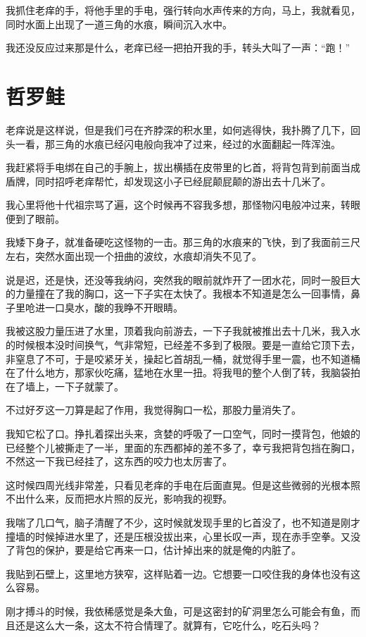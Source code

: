 我抓住老痒的手，将他手里的手电，强行转向水声传来的方向，马上，我就看见，同时水面上出现了一道三角的水痕，瞬间沉入水中。

我还没反应过来那是什么，老痒已经一把拍开我的手，转头大叫了一声：“跑！”

\chapter{哲罗鲑}

老痒说是这样说，但是我们弓在齐脖深的积水里，如何逃得快，我扑腾了几下，回头一看，那三角的水痕已经闪电般向我冲了过来，经过的水面翻起一阵浑浊。

我赶紧将手电绑在自己的手腕上，拔出横插在皮带里的匕首，将背包背到前面当成盾牌，同时招呼老痒帮忙，却发现这小子已经屁颠屁颠的游出去十几米了。

我心里将他十代祖宗骂了遍，这个时候再不容我多想，那怪物闪电般冲过来，转眼便到了眼前。

我矮下身子，就准备硬吃这怪物的一击。那三角的水痕来的飞快，到了我面前三尺左右，突然水面出现一个扭曲的波纹，水痕却消失不见了。

说是迟，还是快，还没等我纳闷，突然我的眼前就炸开了一团水花，同时一股巨大的力量撞在了我的胸口，这一下子实在太快了。我根本不知道是怎么一回事情，鼻子里呛进一口臭水，酸的我睁不开眼睛。

我被这股力量压进了水里，顶着我向前游去，一下子我就被推出去十几米，我入水的时候根本没时间换气，气非常短，已经差不多到了极限。要是一直给它顶下去，非窒息了不可，于是咬紧牙关，操起匕首胡乱一桶，就觉得手里一震，也不知道桶在了什么地方，那家伙吃痛，猛地在水里一扭。将我甩的整个人倒了转，我脑袋拍在了墙上，一下子就蒙了。

不过好歹这一刀算是起了作用，我觉得胸口一松，那股力量消失了。

我知它松了口。挣扎着探出头来，贪婪的呼吸了一口空气，同时一摸背包，他娘的已经整个儿被撕走了一半，里面的东西都掉的差不多了，幸亏我把背包挡在胸口，不然这一下我已经挂了，这东西的咬力也太厉害了。

这时候四周光线非常差，只看见老痒的手电在后面直晃。但是这些微弱的光根本照不出什么来，反而把水片照的反光，影响我的视野。

我喘了几口气，脑子清醒了不少，这时候就发现手里的匕首没了，也不知道是刚才撞墙的时候掉进水里了，还是压根没拔出来，心里长叹一声，现在赤手空拳。又没了背包的保护，要是给它再来一口，估计掉出来的就是俺的内脏了。

我贴到石壁上，这里地方狭窄，这样贴着一边。它想要一口咬住我的身体也没有这么容易。

刚才搏斗的时候，我依稀感觉是条大鱼，可是这密封的矿洞里怎么可能会有鱼，而且还是这么大一条，这太不符合情理了。就算有，它吃什么，吃石头吗？

